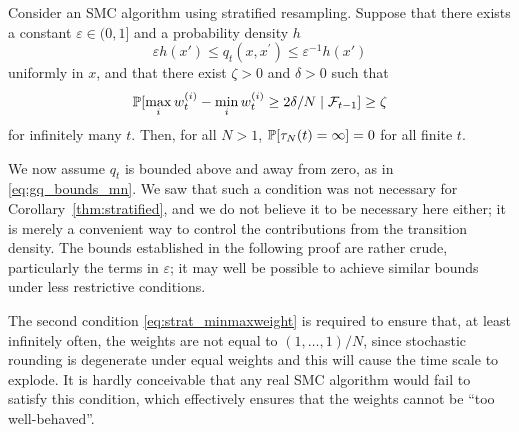 \begin{prop}\label{thm:strat_nontriviality}
Consider an SMC algorithm using stratified resampling.
Suppose that there exists a constant $\varepsilon \in (0,1]$ and a probability density $h$
\begin{equation*}
\varepsilon h(x') \leq q_t(x, x^\prime) \leq \varepsilon^{-1} h(x')
\end{equation*}
uniformly in $x$, and that there exist $\zeta >0$ and $\delta >0$ such that 
\begin{equation}
\mathbb{P}[ \max_i w_t^{(i)} - \min_i w_t^{(i)} \geq 2\delta/N \mid \mathcal{F}_{t-1} ] \geq \zeta \label{eq:strat_minmaxweight}
\end{equation}
 for infinitely many $t$. Then, for all $N>1$, $\mathbb{P}[ \tau_N(t) = \infty ] =0$ for all finite $t$.
\end{prop}
We now assume $q_t$ is bounded above and away from zero, as in \eqref{eq:gq_bounds_mn}.
We saw that such a condition was not necessary for Corollary~\ref{thm:stratified}, and we do not believe it to be necessary here either; it is merely a convenient way to control the contributions from the transition density. The bounds established in the following proof are rather crude, particularly the terms in $\varepsilon$; it may well be possible to achieve similar bounds under less restrictive conditions.

The second condition \eqref{eq:strat_minmaxweight} is required to ensure that, at least infinitely often, the weights are not equal to $(1,\dots,1)/N$, since stochastic rounding is degenerate under equal weights and this will cause the time scale to explode. 
It is hardly conceivable that any real SMC algorithm would fail to satisfy this condition, which effectively ensures that the weights cannot be ``too well-behaved''.


